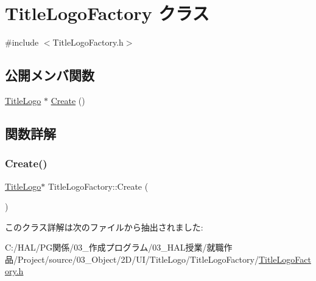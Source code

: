 \hypertarget{class_title_logo_factory}{}\section{Title\+Logo\+Factory クラス}
\label{class_title_logo_factory}


{\ttfamily \#include $<$Title\+Logo\+Factory.\+h$>$}

\subsection*{公開メンバ関数}
\begin{DoxyCompactItemize}
\item 
\mbox{\hyperlink{class_title_logo}{Title\+Logo}} $\ast$ \mbox{\hyperlink{class_title_logo_factory_acbd10f361541910e9c0cee26770f0150}{Create}} ()
\end{DoxyCompactItemize}


\subsection{関数詳解}
\mbox{\label{class_title_logo_factory_acbd10f361541910e9c0cee26770f0150}} 
\subsubsection{\texorpdfstring{Create()}{Create()}}
{\footnotesize\ttfamily \mbox{\hyperlink{class_title_logo}{Title\+Logo}}$\ast$ Title\+Logo\+Factory\+::\+Create (\begin{DoxyParamCaption}{ }\end{DoxyParamCaption})\hspace{0.3cm}{\ttfamily [inline]}}



このクラス詳解は次のファイルから抽出されました\+:\begin{DoxyCompactItemize}
\item 
C\+:/\+H\+A\+L/\+P\+G関係/03\+\_\+作成プログラム/03\+\_\+\+H\+A\+L授業/就職作品/\+Project/source/03\+\_\+\+Object/2\+D/\+U\+I/\+Title\+Logo/\+Title\+Logo\+Factory/\mbox{\hyperlink{_title_logo_factory_8h}{Title\+Logo\+Factory.\+h}}\end{DoxyCompactItemize}
